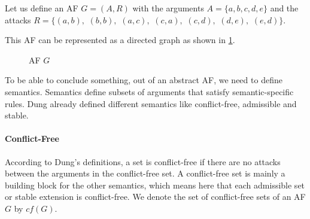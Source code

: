 \begin{example}
    Let us define an AF $G = (A, R)$ with the arguments
    $A=\{a, b, c, d, e\}$ and the attacks
    $R=\bigl\{(a,b),$
    $(b,b),$
    $(a,c),$
    $(c,a),$
    $(c,d),$
    $(d,e),$
    $(e,d)\bigl\}.$

    This AF can be represented as a directed graph as shown in \cref{af:backgroundAFexample1}.
    \begin{figure}[h]
        \centering
        \caption{AF $G$}
        \label{af:backgroundAFexample1}
    \end{figure}
\end{example}

To be able to conclude something, out of an abstract AF, we need to define semantics. Semantics define subsets of arguments that satisfy semantic-specific rules. Dung already defined different semantics \cite{DUNG1995321} like conflict-free, admissible and stable.

\newpage
\paragraph{Conflict-Free} According to Dung's definitions, a set is conflict-free if there are no attacks between the arguments in the conflict-free set. A conflict-free set is mainly a building block for the other semantics, which means here that each admissible set or stable extension is conflict-free. We denote the set of conflict-free sets of an AF $G$ by $cf(G)$.

